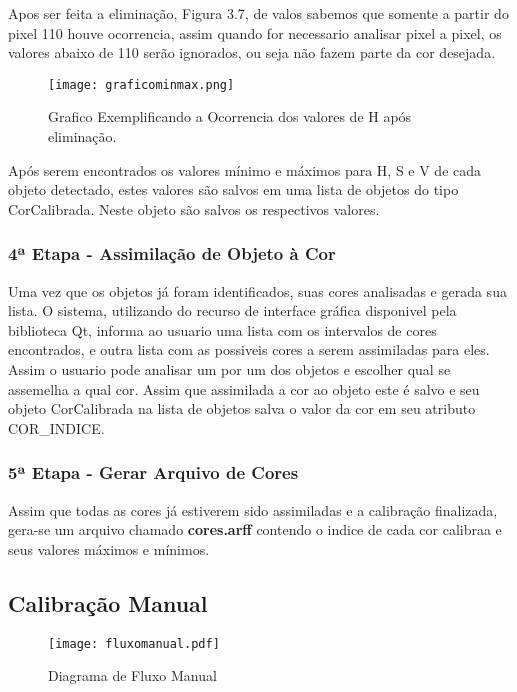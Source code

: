  Apos ser feita a eliminação, Figura 3.7, de valos sabemos que somente a partir do pixel 110 houve ocorrencia, assim quando for necessario analisar pixel a pixel, os valores abaixo de 110 serão ignorados, ou seja não fazem parte da cor desejada.
 \begin{figure}[!h]
 	\centering
 	\texttt{[image: graficominmax.png]}
 	\caption{Grafico Exemplificando a Ocorrencia dos valores de H após eliminação.}
 	\label{Grafico Exemplo}
 \end{figure}

Após serem encontrados os valores mínimo e máximos para H, S e V de cada objeto detectado, estes valores são salvos em uma lista de objetos do tipo CorCalibrada. Neste objeto são salvos os respectivos valores.

 \subsubsection{4ª Etapa - Assimilação de Objeto à Cor}
 Uma vez que os objetos já foram identificados, suas cores analisadas e gerada sua lista. O sistema, utilizando do recurso de interface gráfica disponivel pela biblioteca Qt, informa ao usuario uma lista com os intervalos de cores encontrados, e outra lista com as possiveis cores a serem assimiladas para eles. Assim o usuario pode analisar um por um dos objetos e escolher qual se assemelha a qual cor. Assim que assimilada a cor ao objeto este é salvo e seu objeto CorCalibrada na lista de objetos salva o valor da cor em seu atributo COR\_INDICE.
 
  \subsubsection{5ª Etapa - Gerar Arquivo de Cores}
  Assim que todas as cores já estiverem sido assimiladas e a calibração finalizada, gera-se um arquivo chamado \textbf{cores.arff} contendo o indice de cada cor calibraa e seus valores máximos e mínimos.
  
  		
  	\subsection{Calibração Manual}
  	
  	  		\begin{figure}[!h]
  	  				\centering
  	  				\texttt{[image: fluxomanual.pdf]}
  	  				\caption{Diagrama de Fluxo Manual}
  	  				\label{DiagramaDeFluxoManual}
  	  			\end{figure}
  	  		

